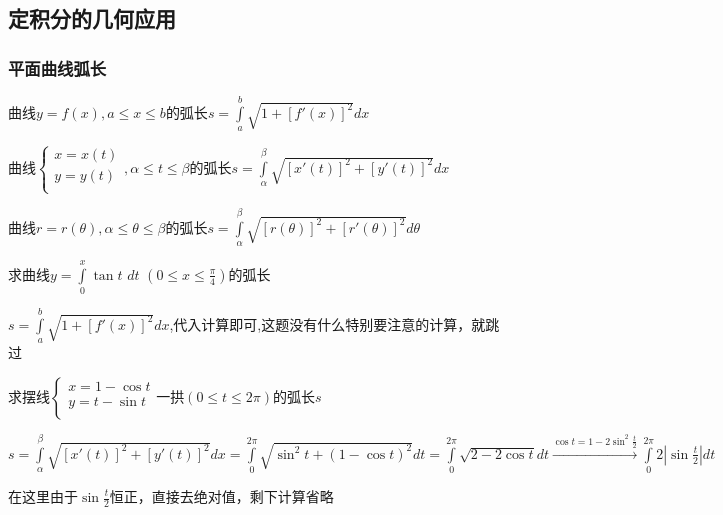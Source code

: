 \documentclass[lang=cn,10pt]{elegantbook}
\begin{document}
\subsection{定积分的几何应用}
\subsubsection{平面曲线弧长}
\begin{conclusion}
	曲线$y=f(x),a\le x\le b $的弧长$s=\int\limits_a^b{\sqrt{1+\left[ f\prime\left( x \right) \right] ^2}dx}$
	
	曲线$\begin{cases}
		x=x\left( t \right)\\
		y=y\left( t \right)\\
	\end{cases},\alpha \le t\le \beta$的弧长$s=\int\limits_{\alpha}^{\beta}{\sqrt{\left[ x\prime\left( t \right) \right] ^2+\left[ y\prime\left( t \right) \right] ^2}dx}$
	
	曲线$r=r\left( \theta \right) ,\alpha \le \theta \le \beta \text{的弧长}s=\int\limits_{\alpha}^{\beta}{\sqrt{\left[ r\left( \theta \right) \right] ^2+\left[ r\prime\left( \theta \right) \right] ^2}d\theta}$
\end{conclusion}
\begin{example}
	求曲线$y=\int\limits_0^x{\tan t\,\,dt\,\,\left( 0\le x\le \frac{\pi}{4} \right)}$的弧长
\end{example}
\begin{solution}
	
	$s=\int\limits_a^b{\sqrt{1+\left[ f\prime\left( x \right) \right] ^2}dx}$,代入计算即可,这题没有什么特别要注意的计算，就跳过
\end{solution}
\begin{example}
	求摆线$\begin{cases}
		x=1-\cos t\\
		y=t-\sin t\\
	\end{cases}\text{一拱}\left( 0\le t\le 2\pi \right) \text{的弧长}s$
\end{example}
\begin{solution}
	
	$s=\int\limits_{\alpha}^{\beta}{\sqrt{\left[ x\prime\left( t \right) \right] ^2+\left[ y\prime\left( t \right) \right] ^2}dx}=\int\limits_0^{2\pi}{\sqrt{\sin ^2t+\left( 1-\cos t \right) ^2}dt}=\int\limits_0^{2\pi}{\sqrt{2-2\cos t}dt}\overset{\cos t=1-2\sin ^2\frac{t}{2}}{\longrightarrow}\int\limits_0^{2\pi}{2|\sin \frac{t}{2}|dt}
	$
	
	在这里由于$\sin\frac{t}{2}$恒正，直接去绝对值，剩下计算省略
\end{solution}
\end{document}
